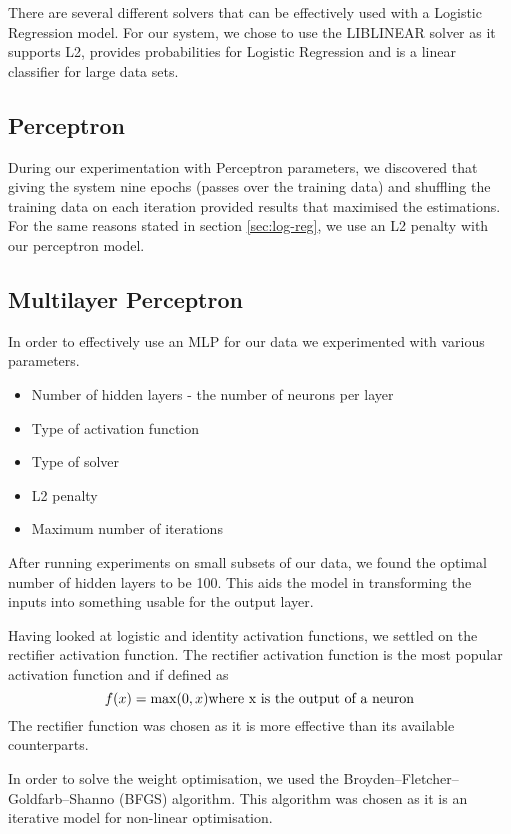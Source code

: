 \documentclass[bsc,frontabs,twoside,singlespacing,parskip,deptreport]{infthesis}     %
\begin{document}
 There are several different solvers that can be effectively used with a Logistic Regression model.
 For our system, we chose to use the LIBLINEAR solver as it supports L2, provides probabilities
 for Logistic Regression and is a linear classifier for large data sets\cite{fan2008liblinear}.
 
 \subsection{Perceptron}
 During our experimentation with Perceptron parameters, we discovered that giving the system nine epochs (passes
 over the training data) and shuffling the training data on each iteration provided results that maximised the
 estimations. For the same reasons stated in section \ref{sec:log-reg}, we use an L2 penalty with our perceptron
 model.
 
 \subsection{Multilayer Perceptron}
 In order to effectively use an MLP for our data we experimented with various parameters.
 \begin{itemize}
 \item Number of hidden layers - the number of neurons per layer
 \item Type of activation function
 \item Type of solver
 \item L2 penalty
 \item Maximum number of iterations
 \end{itemize}
 
 After running experiments on  small subsets of our data, we found the optimal number of hidden layers to be 100. 
 This aids the model in transforming the inputs into something usable for the output layer.
 
 Having looked at logistic and identity activation functions, we settled on the rectifier activation function.
 The rectifier activation function is the most popular activation function \cite{lecun2015deep} and if defined as
 \begin{equation}
   f(x) = \text{max}(0,x)\nonumber\\
   \text{where x is the output of a neuron}\nonumber
 \end{equation}
 The rectifier function was chosen as it is more effective than its available counterparts\cite{glorot2011deep}.

 In order to solve the weight optimisation, we used the Broyden–Fletcher–Goldfarb–Shanno (BFGS) algorithm.
 This algorithm was chosen as it is an iterative model for non-linear optimisation.
\end{document}
